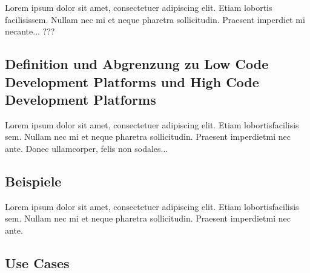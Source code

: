 \documentclass{article}
\begin{document}
	
	Lorem ipsum dolor sit amet, consectetuer adipiscing elit.  
	Etiam lobortis facilisissem.  Nullam nec mi et neque pharetra 
	sollicitudin.  Praesent imperdiet mi necante... ???
	
	\subsection{Definition und Abgrenzung zu Low Code Development Platforms und High Code Development Platforms}	
	
	
	
	Lorem  ipsum  dolor  sit  amet,  consectetuer  adipiscing  
	elit.   Etiam  lobortisfacilisis sem.  Nullam nec mi et 
	neque pharetra sollicitudin. Praesent imperdietmi nec ante. 
	Donec ullamcorper, felis non sodales...
	
	\subsection{Beispiele}	
	Lorem  ipsum  dolor  sit  amet,  consectetuer  adipiscing  
	elit.   Etiam  lobortisfacilisis sem.  Nullam nec mi et 
	neque pharetra sollicitudin.  Praesent imperdietmi nec ante. 
	
	\subsection{Use Cases}	
	
\end{document}
